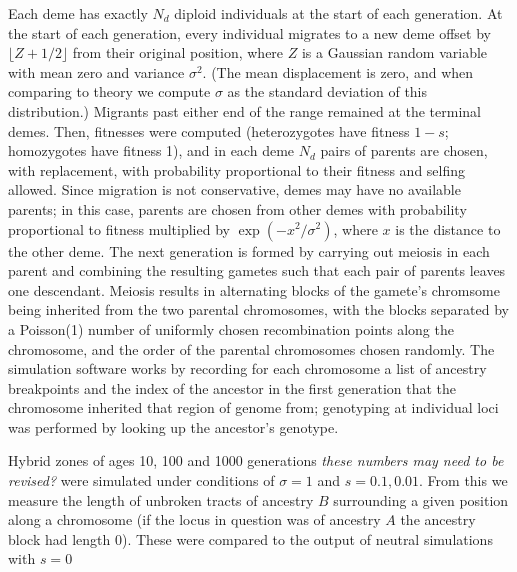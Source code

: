 \documentclass[12pt]{article}
\newcommand{\alisa}[1]{{\em \color{red} #1}}
\begin{document}
Each deme has exactly $N_d$ diploid individuals at the start of each generation.
At the start of each generation, every individual migrates to a new deme  offset by $\lfloor Z + 1/2 \rfloor$ from their original position,
where $Z$ is a Gaussian random variable with mean zero and variance $\sigma^2$.
(The mean displacement is zero, and when comparing to theory we compute $\sigma$ as the standard deviation of this distribution.)
Migrants past either end of the range remained at the terminal demes.
Then, 
fitnesses were computed (heterozygotes have fitness $1-s$; homozygotes have fitness 1),
and in each deme $N_d$ pairs of parents are chosen, with replacement,
with probability proportional to their fitness and selfing allowed.
Since migration is not conservative, demes may have no available parents;
in this case, parents are chosen from other demes with probability proportional to fitness
multiplied by $\exp(-x^2/\sigma^2)$, where $x$ is the distance to the other deme.
The next generation is formed by carrying out meiosis in each parent
and combining the resulting gametes such that each pair of parents leaves one descendant.
Meiosis results in alternating blocks of the gamete's chromsome
being inherited from the two parental chromosomes,
with the blocks separated by a Poisson(1) number of uniformly chosen recombination points along the chromosome,
and the order of the parental chromosomes chosen randomly.
The simulation software works by recording for each chromosome
a list of ancestry breakpoints and the index of the ancestor in the first generation
that the chromosome inherited that region of genome from;
genotyping at individual loci was performed by looking up the ancestor's genotype.

Hybrid zones of ages 10, 100 and 1000 generations \alisa{these numbers may need to be revised?} were simulated under conditions of $\sigma=1$ and $s=0.1,0.01$. From this we measure the length of unbroken tracts of ancestry $B$ surrounding a given position along a chromosome (if the locus in question was of ancestry $A$ the ancestry block had length $0$). These were compared to the output of neutral simulations with $s=0$
\end{document}

